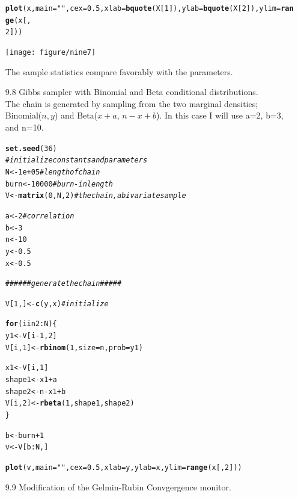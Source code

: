 \documentclass{article}\usepackage[]{graphicx}\usepackage[]{color}
\makeatletter
\newcommand{\hlstr}[1]{\textcolor[rgb]{0.192,0.494,0.8}{#1}}%
\newcommand{\hlcom}[1]{\textcolor[rgb]{0.678,0.584,0.686}{\textit{#1}}}%
\newcommand{\hlkwd}[1]{\textcolor[rgb]{0.737,0.353,0.396}{\textbf{#1}}}%
\newenvironment{kframe}{%
 \def\at@end@of@kframe{}%
 \ifinner\ifhmode%
  \def\at@end@of@kframe{\end{minipage}}%
  \begin{minipage}{\columnwidth}%
 \fi\fi%
 \def\FrameCommand##1{\hskip\@totalleftmargin \hskip-\fboxsep
 \colorbox{shadecolor}{##1}\hskip-\fboxsep
     \hskip-\linewidth \hskip-\@totalleftmargin \hskip\columnwidth}%
 \MakeFramed {\advance\hsize-\width
   \@totalleftmargin\z@ \linewidth\hsize
   \@setminipage}}%
 {\par\unskip\endMakeFramed%
 \at@end@of@kframe}
\newenvironment{knitrout}{}{} %
\makeatother
\begin{document}
\begin{itemize}
\begin{knitrout}
\begin{kframe}
\begin{alltt}
\hlkwd{plot}(x, main = \hlstr{""}, cex = 0.5, xlab = \hlkwd{bquote}(X[1]), ylab = \hlkwd{bquote}(X[2]), ylim = \hlkwd{range}(x[, 
    2]))
\end{alltt}
\end{kframe}
\texttt{[image: figure/nine7]} 

\end{knitrout}

The sample statistics compare favorably with the parameters.\\

\item[9.8]  Gibbs sampler with Binomial and Beta conditional distributions.\\

The chain is generated by sampling from the two marginal densities; Binomial($n,y$) and Beta($x+a$, $n-x+b$).  In this case I will use a=2, b=3, and n=10.\\

\begin{knitrout}
\color{fgcolor}\begin{kframe}
\begin{alltt}
\hlkwd{set.seed}(36)
\hlcom{# initialize constants and parameters}
N <- 1e+05  \hlcom{#length of chain}
burn <- 10000  \hlcom{#burn-in length}
V <- \hlkwd{matrix}(0, N, 2)  \hlcom{#the chain, a bivariate sample}

a <- 2  \hlcom{#correlation}
b <- 3
n <- 10
y <- 0.5
x <- 0.5

\hlcom{###### generate the chain #####}

V[1, ] <- \hlkwd{c}(y, x)  \hlcom{#initialize}

\hlkwd{for} (i in 2:N) \{
    y1 <- V[i - 1, 2]
    V[i, 1] <- \hlkwd{rbinom}(1, size = n, prob = y1)
    
    x1 <- V[i, 1]
    shape1 <- x1 + a
    shape2 <- n - x1 + b
    V[i, 2] <- \hlkwd{rbeta}(1, shape1, shape2)
\}

b <- burn + 1
v <- V[b:N, ]

\hlkwd{plot}(v, main = \hlstr{""}, cex = 0.5, xlab = y, ylab = x, ylim = \hlkwd{range}(x[, 2]))
\end{alltt}


{\ttfamily\noindent\bfseries\color{errorcolor}{\#\# Error: incorrect number of dimensions}}\end{kframe}
\end{knitrout}


\item[9.9] Modification of the Gelmin-Rubin Convgergence monitor.\\


\end{itemize}
\end{document}
